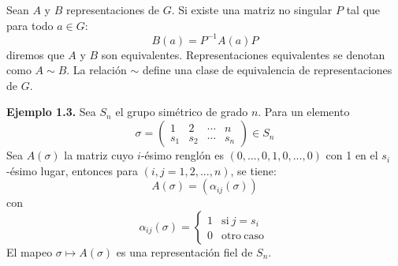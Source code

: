 \documentclass[12pt]{book}
\theoremstyle{definition}
\newcounter{in}
\begin{document}
Sean $A$ y $B$ representaciones de $G$. Si existe una
matriz no singular $P$ tal que para todo $a \in G$:
\begin{equation*}
  B\left(a\right)= P^{-1}A\left(a\right)P
\end{equation*}
diremos que $A$ y $B$ son equivalentes. Representaciones equivalentes
se denotan como $A \sim B$. La relación $\sim$
define una clase de equivalencia de representaciones de $G$.

\textbf{Ejemplo 1.3.} Sea $S_{n}$ el grupo simétrico de grado
$n$. Para un elemento
\begin{equation*}
  \sigma =
  \begin{pmatrix}
    1 & 2 & \cdots  & n\\ 
    s_{1} & s_{2} & \cdots & s_{n}
  \end{pmatrix} 
  \in S_{n}
\end{equation*}  
Sea $A\left(\sigma\right)$ la matriz cuyo $i$-ésimo renglón es
$\left(0,...,0,1,0,...,0\right)$ con 1 en el $s_{i}$-ésimo lugar,
entonces para $\left(i,j=1,2,...,n\right)$, se tiene:
\begin{equation*}
A\left(\sigma\right) = \left(\alpha_{ij}\left(\sigma\right)\right) 
\end{equation*}
con
\begin{equation*}
         \alpha_{ij}\left(\sigma\right) = \left\{
	       \begin{array}{ll}
		 1      & \mathrm{si\ } j = s_{i} \\
		 0      & \mathrm{otro\ caso\ } 
	       \end{array}
	     \right.
\end{equation*}
El mapeo $\sigma \mapsto A\left(\sigma\right)$ es una representación
fiel de $S_{n}$.
\end{document}
